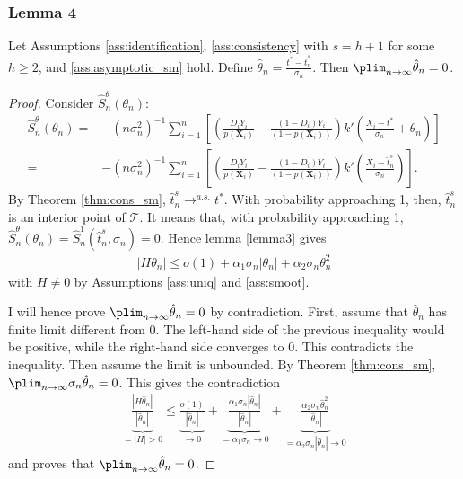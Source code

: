 {\subsubsection*{Lemma 4}
    \begin{lem}\label{lemma4}
         Let Assumptions \ref{ass:identification}, \ref{ass:consistency} with $s=h + 1$ for some $h\geq 2$, and \ref{ass:asymptotic_sm} hold. Define $\hat{\theta}_n = \frac{t^* - \hat{t}^s_n}{\sigma_n}$. Then $\plim_{n \rightarrow \infty} \hat{\theta}_n = 0$.
    \end{lem}
    \begin{proof}
        Consider $\hat{S}^\theta_n(\theta_n)$:
        \begin{align}
            \hat{S}^\theta_n(\theta_n) =& - (n \sigma_n^2)^{-1} \sum_{i=1}^n \left[\left(\frac{D_i Y_i}{p(\textbf{X}_i)} - \frac{(1-D_i) Y_i}{(1-p(\textbf{X}_i))} \right) k'\left(\frac{X_i - t^*}{\sigma_n} + \theta_n \right) \right] \\
            =& -(n \sigma_n^2)^{-1} \sum_{i=1}^n \left[\left(\frac{D_i Y_i}{p(\textbf{X}_i)} - \frac{(1-D_i) Y_i}{(1-p(\textbf{X}_i))} \right) k'\left(\frac{X_i - \hat{t}^s_n}{\sigma_n} \right) \right].
        \end{align}
        By Theorem \ref{thm:cons_sm}, $\hat{t}^s_n \rightarrow^{a.s.} t^*$. With probability approaching 1, then, $\hat{t}^s_n$ is an interior point of $\mathcal{T}$. It means that, with probability approaching 1, $\hat{S}^\theta_n(\theta_n) = \hat{S}^1_n(\hat{t}^s_n,\sigma_n) = 0$. Hence lemma \ref{lemma3} gives
        \begin{gather}
            |H\theta_n| \leq o(1) + \alpha_1 \sigma_n |\theta_n| + \alpha_2 \sigma_n \theta_n^2
        \end{gather}
        with $H \neq 0$ by Assumptions \ref{ass:uniq} and \ref{ass:smoot}.
        
        I will hence prove $\plim_{n \rightarrow \infty} \hat{\theta}_n = 0$ by contradiction. First, assume that $\hat{\theta}_n$ has finite limit different from 0. The left-hand side of the previous inequality would be positive, while the right-hand side converges to 0. This contradicts the inequality. Then assume the limit is unbounded. By Theorem \ref{thm:cons_sm}, $\plim_{n \rightarrow \infty} \sigma_n \hat{\theta}_n = 0$. This gives the contradiction
        \begin{gather}
            \underbrace{\frac{|H\hat{\theta}_n|}{|\hat{\theta}_n|}}_{=|H|>0} \leq \underbrace{\frac{ o(1)}{|\hat{\theta}_n|}}_{\rightarrow 0} + \underbrace{\frac{\alpha_1 \sigma_n |\hat{\theta}_n|}{|\hat{\theta}_n|}}_{=\alpha_1 \sigma_n\rightarrow 0} + \underbrace{\frac{\alpha_2 \sigma_n \hat{\theta}_n^2}{|\hat{\theta}_n|}}_{=\alpha_2 \sigma_n|\hat{\theta}_n|\rightarrow 0}
        \end{gather}
        and proves that $\plim_{n \rightarrow \infty} \hat{\theta}_n = 0$.
    \end{proof}
    
}
